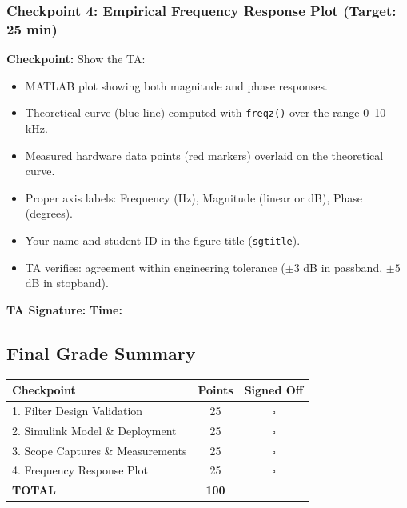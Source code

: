\documentclass[11pt,letterpaper]{article}
\providecommand{\cpECE}[1]{\textcolor{OliveGreen}{\textbf{Checkpoint:} #1}}
\begin{document}
\vspace{0.5cm}

\subsubsection*{Checkpoint 4: Empirical Frequency Response Plot (Target: 25 min)}

\cpECE{Show the TA:}
\begin{itemize}
    \item[$\square$] MATLAB plot showing both magnitude and phase responses.
    \item[$\square$] Theoretical curve (blue line) computed with \texttt{freqz()} over the range 0--10 kHz.
    \item[$\square$] Measured hardware data points (red markers) overlaid on the theoretical curve.
    \item[$\square$] Proper axis labels: Frequency (Hz), Magnitude (linear or dB), Phase (degrees).
    \item[$\square$] Your name and student ID in the figure title (\texttt{sgtitle}).
    \item[$\square$] TA verifies: agreement within engineering tolerance ($\pm 3$ dB in passband, $\pm 5$ dB in stopband).
\end{itemize}

\vspace{0.3cm}
\textbf{TA Signature:} \underline{\hspace{2.5cm}} \quad \textbf{Time:} \underline{\hspace{1.5cm}}

\vspace{1cm}

\subsection*{Final Grade Summary}

\begin{center}
\begin{tabular}{|l|c|c|}
\hline
\textbf{Checkpoint} & \textbf{Points} & \textbf{Signed Off} \\
\hline
1. Filter Design Validation & 25 & $\square$ \\
2. Simulink Model \& Deployment & 25 & $\square$ \\
3. Scope Captures \& Measurements & 25 & $\square$ \\
4. Frequency Response Plot & 25 & $\square$ \\
\hline
\textbf{TOTAL} & \textbf{100} & \\
\hline
\end{tabular}
\end{center}
\end{document}
